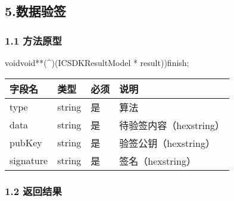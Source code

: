 \documentclass[letterpaper,10pt,english]{sphinxmanual}
\begin{document}

\begin{sphinxVerbatim}[commandchars=\\\{\}]
     
\end{sphinxVerbatim}


\subsection{5.数据验签}
\label{\detokenize{BCBWalletSDK_u63a5_u53e3_u8bf4_u660e:id98}}

\subsubsection{1.1 方法原型}
\label{\detokenize{BCBWalletSDK_u63a5_u53e3_u8bf4_u660e:id99}}
\sphinxstylestrong{-(}voidvoid**(\textasciicircum{})(ICSDKResultModel * result))finish;



\begin{savenotes}\sphinxattablestart
\centering
\begin{tabulary}{\linewidth}[t]{|T|T|T|T|}
\hline
\sphinxstyletheadfamily 
字段名
&\sphinxstyletheadfamily 
类型
&\sphinxstyletheadfamily 
必须
&\sphinxstyletheadfamily 
说明
\\
\hline
type
&
string
&
是
&
算法
\\
\hline
data
&
string
&
是
&
待验签内容（hexstring）
\\
\hline
pubKey
&
string
&
是
&
验签公钥（hexstring）
\\
\hline
signature
&
string
&
是
&
签名（hexstring）
\\
\hline
\end{tabulary}
\par
\sphinxattableend\end{savenotes}


\subsubsection{1.2 返回结果}
\label{\detokenize{BCBWalletSDK_u63a5_u53e3_u8bf4_u660e:id100}}
\end{document}
